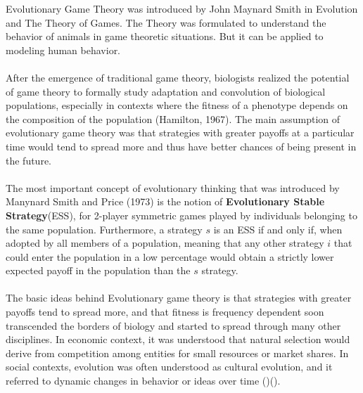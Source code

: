 Evolutionary Game Theory was introduced by John Maynard Smith in Evolution and The Theory of Games. The Theory was formulated to understand the behavior of animals in game theoretic situations. But it can be applied to modeling human behavior.

\paragraph{}After the emergence of traditional game theory, biologists realized the potential of game theory to formally study adaptation and convolution of biological populations, especially in contexts where the fitness of a phenotype depends on the composition of the population (Hamilton, 1967). The main assumption of evolutionary game theory was that strategies with greater payoffs at a particular time would tend to spread more and thus have better chances of being present in the future.
\paragraph{}The most important concept of evolutionary thinking that was introduced by Manynard Smith and Price (1973) is the notion of \textbf{Evolutionary Stable Strategy}(ESS), for 2-player symmetric games played by individuals belonging to the same population. Furthermore, a strategy $s$ is an ESS if and only if, when adopted by all members of a population, meaning that any other strategy $i$ that could enter the population in a low percentage would obtain a strictly  lower expected payoff in the population than the $s$ strategy.
\paragraph{}The basic ideas behind Evolutionary game theory is that strategies with greater payoffs tend to spread more, and that fitness is frequency dependent soon transcended the borders of biology and started to spread through many other disciplines. In economic context, it was understood that natural selection would derive from competition among entities for small resources or market shares. In social contexts, evolution was often understood as cultural evolution, and it referred to dynamic changes in behavior or ideas over time (\cite{Nelson and Winter, 1982})(\cite{Boyd and Richerson, 1985}).
